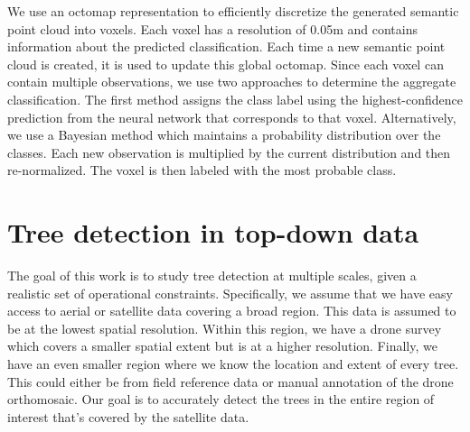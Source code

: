 We use an octomap \cite{hornung13auro} representation to efficiently discretize the generated semantic point cloud into voxels. Each voxel has a resolution of 0.05m and contains information about the predicted classification. Each time a new semantic point cloud is created, it is used to update this global octomap. Since each voxel can contain multiple observations, we use two approaches to determine the aggregate classification. The first method assigns the class label using the highest-confidence prediction from the neural network that corresponds to that voxel. Alternatively, we use a Bayesian method which maintains a probability distribution over the classes. Each new observation is multiplied by the current distribution and then re-normalized. The voxel is then labeled with the most probable class.

%
%

\section{Tree detection in top-down data}
The goal of this work is to study tree detection at multiple scales, given a realistic set of operational constraints. Specifically, we assume that we have easy access to aerial or satellite data covering a broad region. This data is assumed to be at the lowest spatial resolution. Within this region, we have a drone survey which covers a smaller spatial extent but is at a higher resolution. Finally, we have an even smaller region where we know the location and extent of every tree. This could either be from field reference data or manual annotation of the drone orthomosaic. Our goal is to accurately detect the trees in the entire region of interest that's covered by the satellite data. 


